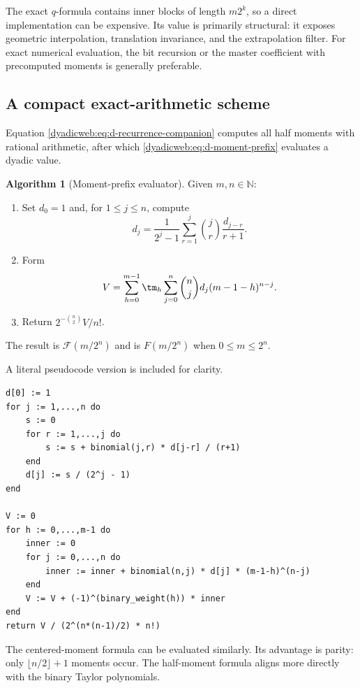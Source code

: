 \documentclass[11pt,oneside]{article}
\theoremstyle{definition}
\newtheorem{algorithm}[theorem]{Algorithm}
\theoremstyle{remark}
\newcommand{\N}{\mathbb N}
\begin{document}
The exact $q$-formula contains inner blocks of length $m2^k$, so a direct implementation can
be expensive.  Its value is primarily structural: it exposes geometric interpolation,
translation invariance, and the extrapolation filter.  For exact numerical evaluation, the
bit recursion or the master coefficient with precomputed moments is generally preferable.

\subsection{A compact exact-arithmetic scheme}

Equation \eqref{dyadicweb:eq:d-recurrence-companion} computes all half moments with rational arithmetic,
after which \eqref{dyadicweb:eq:d-moment-prefix} evaluates a dyadic value.

\begin{algorithm}[Moment-prefix evaluator]
\label{dyadicweb:alg:moment-prefix}
Given $m,n\in\N$:
\begin{enumerate}
\item Set $d_0=1$ and, for $1\le j\le n$, compute
\[
 d_j=\frac1{2^j-1}\sum_{r=1}^{j}\binom jr\frac{d_{j-r}}{r+1}.
\]
\item Form
\[
 V=\sum_{h=0}^{m-1}\tm_h
   \sum_{j=0}^{n}\binom njd_j(m-1-h)^{n-j}.
\]
\item Return $2^{-\binom n2}V/n!$.
\end{enumerate}
The result is $\mathcal F(m/2^n)$ and is $F(m/2^n)$ when $0\le m\le2^n$.
\end{algorithm}

A literal pseudocode version is included for clarity.

\begin{lstlisting}[style=pseudo,caption={Exact dyadic evaluation from half moments.}]
d[0] := 1
for j := 1,...,n do
    s := 0
    for r := 1,...,j do
        s := s + binomial(j,r) * d[j-r] / (r+1)
    end
    d[j] := s / (2^j - 1)
end

V := 0
for h := 0,...,m-1 do
    inner := 0
    for j := 0,...,n do
        inner := inner + binomial(n,j) * d[j] * (m-1-h)^(n-j)
    end
    V := V + (-1)^(binary_weight(h)) * inner
end
return V / (2^(n*(n-1)/2) * n!)
\end{lstlisting}

The centered-moment formula can be evaluated similarly.  Its advantage is parity: only
$\lfloor n/2\rfloor+1$ moments occur.  The half-moment formula aligns more directly with the
binary Taylor polynomials.
\end{document}
